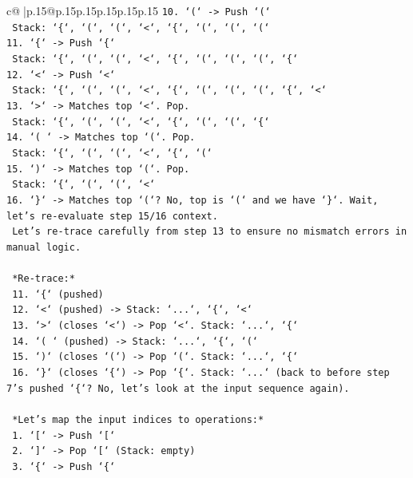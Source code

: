 \documentclass{article}
\begin{document}
{\begin{supertabular}{c@{$\;$}|p{.15\linewidth}@{}p{.15\linewidth}p{.15\linewidth}p{.15\linewidth}p{.15\linewidth}p{.15\linewidth}}
{{{\texttt{10. `(` {-}> Push `(`} \\
\texttt{    Stack: `\{`, `(`, `(`, `<`, `\{`, `(`, `(`, `(`} \\
\texttt{11. `\{` {-}> Push `\{`} \\
\texttt{    Stack: `\{`, `(`, `(`, `<`, `\{`, `(`, `(`, `(`, `\{`} \\
\texttt{12. `<` {-}> Push `<`} \\
\texttt{    Stack: `\{`, `(`, `(`, `<`, `\{`, `(`, `(`, `(`, `\{`, `<`} \\
\texttt{13. `>` {-}> Matches top `<`. Pop.} \\
\texttt{    Stack: `\{`, `(`, `(`, `<`, `\{`, `(`, `(`, `\{`} \\
\texttt{14. `( ` {-}> Matches top `(`. Pop.} \\
\texttt{    Stack: `\{`, `(`, `(`, `<`, `\{`, `(`} \\
\texttt{15. `)` {-}> Matches top `(`. Pop.} \\
\texttt{    Stack: `\{`, `(`, `(`, `<`} \\
\texttt{16. `\}` {-}> Matches top `(`? No, top is `(` and we have `\}`. Wait, let's re{-}evaluate step 15/16 context.} \\
\texttt{    Let's re{-}trace carefully from step 13 to ensure no mismatch errors in manual logic.} \\
\\ 
\texttt{    *Re{-}trace:*} \\
\texttt{    11. `\{` (pushed)} \\
\texttt{    12. `<` (pushed) {-}> Stack: `...`, `\{`, `<`} \\
\texttt{    13. `>` (closes `<`) {-}> Pop `<`. Stack: `...`, `\{`} \\
\texttt{    14. `( ` (pushed) {-}> Stack: `...`, `\{`, `(`} \\
\texttt{    15. `)` (closes `(`) {-}> Pop `(`. Stack: `...`, `\{`} \\
\texttt{    16. `\}` (closes `\{`) {-}> Pop `\{`. Stack: `...` (back to before step 7's pushed `\{`? No, let's look at the input sequence again).} \\
\\ 
\texttt{    *Let's map the input indices to operations:*} \\
\texttt{    1.  `{[}` {-}> Push `{[}`} \\
\texttt{    2.  `{]}` {-}> Pop `{[}` (Stack: empty)} \\
\texttt{    3.  `\{` {-}> Push `\{`} \\
}}}
\end{supertabular}}
\end{document}
